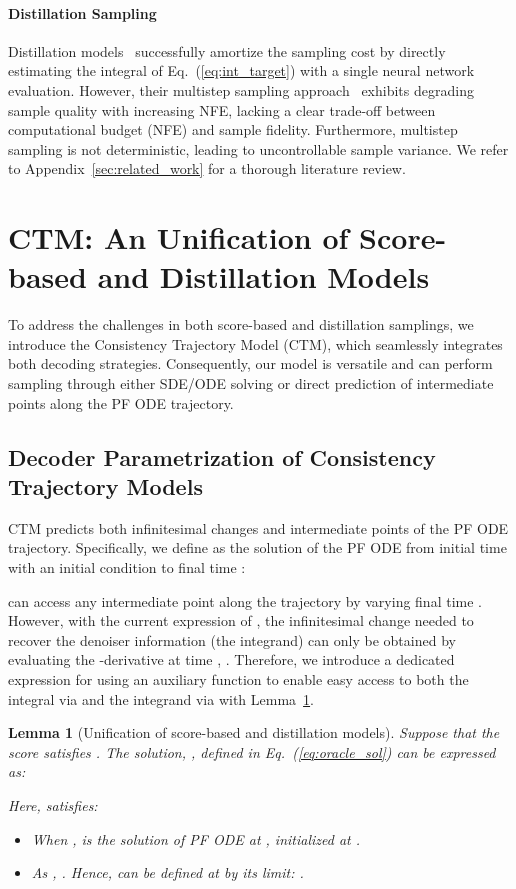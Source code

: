 \documentclass{article} \usepackage{iclr2024_coNFErence,times}
\def\eqref#1{equation~\ref{#1}}
\def\eqref#1{(\ref{#1})}
\def\eqref#1{(\ref{#1})}
\newtheorem{lemma}[theorem]{Lemma}
\theoremstyle{definition}
\theoremstyle{remark}
\begin{document}
\paragraph{Distillation Sampling}
Distillation models~\citep{salimans2021progressive,meng2023distillation} successfully amortize the sampling cost by directly estimating the integral of Eq.~\eqref{eq:int_target} with a single neural network evaluation. However, their multistep sampling approach~\citep{song2023consistency} exhibits degrading sample quality with increasing NFE, lacking a clear trade-off between computational budget (NFE) and sample fidelity. Furthermore, multistep sampling is not deterministic, leading to uncontrollable sample variance.
We refer to Appendix~\ref{sec:related_work} for a thorough literature review.

\section{CTM: An Unification of Score-based and Distillation Models}
To address the challenges in both score-based and distillation samplings, we introduce the Consistency Trajectory Model (CTM), which seamlessly integrates both decoding strategies. Consequently, our model is versatile and can perform sampling through either SDE/ODE solving or direct prediction of intermediate points along the PF ODE trajectory.


\subsection{Decoder Parametrization of Consistency Trajectory Models}\label{sec:motivation}

CTM predicts both infinitesimal changes and intermediate points of the PF ODE trajectory. Specifically, we define  as the solution of the PF ODE from initial time  with an initial condition  to final time :

 can access any intermediate point along the trajectory by varying final time . However, with the current expression of , the infinitesimal change needed to recover the denoiser information (the integrand) can only be obtained by evaluating the -derivative at time , . Therefore, we introduce a dedicated expression for  using an auxiliary function  to enable easy access to both the integral via  and the integrand via  with Lemma~\ref{th:unification}. 

\begin{lemma}[Unification of score-based and distillation models]\label{th:unification} Suppose that the score satisfies . 
    The solution, , defined in Eq.~\eqref{eq:oracle_sol} can be expressed as:
    
    Here,  satisfies:
    \begin{itemize}
        \item When ,  is the solution of PF ODE at , initialized at . 
        \item As , . Hence,  can be defined at  by its limit: . \end{itemize}
\end{lemma}
\end{document}
